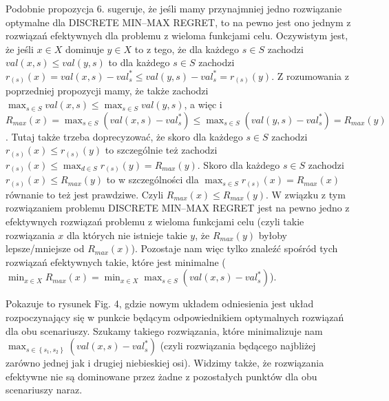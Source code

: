 Podobnie propozycja 6. sugeruje, że jeśli mamy przynajmniej jedno rozwiązanie optymalne dla DISCRETE MIN–MAX REGRET, to na pewno jest ono jednym z rozwiązań efektywnych dla problemu z wieloma funkcjami celu. Oczywistym jest, że jeśli $x \in X$ dominuje $y \in X$ to z tego, że dla każdego $s \in S$ zachodzi $val \left( x, s \right) \leqslant val \left( y, s \right)$ to dla każdego $s \in S$ zachodzi $r_{\left( s \right) } \left( x \right) = val \left( x, s \right) - val^{\ast}_{s} \leqslant val \left( y, s \right) - val^{\ast}_{s} = r_{\left( s \right) } \left( y \right)$. Z rozumowania z poprzedniej propozycji mamy, że także zachodzi $\max_{s \in S} val \left( x, s \right) \leqslant \max_{s \in S} val \left( y, s \right)$, a więc i $R_{max} \left( x \right) = \max_{s \in S} \left( val \left( x, s \right) - val^{\ast}_{s} \right) \leqslant \max_{s \in S} \left( val \left( y, s \right) - val^{\ast}_{s} \right) = R_{max} \left( y \right)$. Tutaj także trzeba doprecyzować, że skoro dla każdego $s \in S$ zachodzi $r_{\left( s \right) } \left( x \right) \leqslant r_{\left( s \right) } \left( y \right)$ to szczególnie też zachodzi $r_{\left( s \right) } \left( x \right) \leqslant \max_{d \in S} r_{\left( s \right) } \left( y \right) = R_{max} \left( y \right)$. Skoro dla każdego $s \in S$ zachodzi $r_{\left( s \right) } \left( x \right) \leqslant R_{max} \left( y \right)$ to w szczególności dla $\max _{s \in S} r_{\left( s \right) } \left( x \right) = R_{max} \left( x \right)$ równanie to też jest prawdziwe. Czyli $R_{max} \left( x \right) \leqslant R_{max} \left( y \right)$. W związku z tym rozwiązaniem problemu DISCRETE MIN–MAX REGRET jest na pewno jedno z efektywnych rozwiązań problemu z wieloma funkcjami celu (czyli takie rozwiązania $x$ dla których nie istnieje takie $y$, że $R_{max} \left( y \right)$ byłoby lepsze/mniejsze od $R_{max} \left( x \right)$). Pozostaje nam więc tylko znaleźć spośród tych rozwiązań efektywnych takie, które jest minimalne ($\min_{x \in X} R_{max} \left( x \right) = \min_{x \in X} \max_{s \in S} \left( val \left( x, s \right) - val^{\ast}_{s} \right)$).

Pokazuje to rysunek Fig. 4, gdzie nowym układem odniesienia jest układ rozpoczynający się w punkcie będącym odpowiednikiem optymalnych rozwiązań dla obu scenariuszy. Szukamy takiego rozwiązania, które minimalizuje nam $\max_{s \in \left\{ s_{1}, s_{2} \right\}} \left( val \left( x, s \right) - val^{\ast}_{s} \right)$ (czyli rozwiązania będącego najbliżej zarówno jednej jak i drugiej niebieskiej osi). Widzimy także, że rozwiązania efektywne nie są dominowane przez żadne z pozostałych punktów dla obu scenariuszy naraz.


